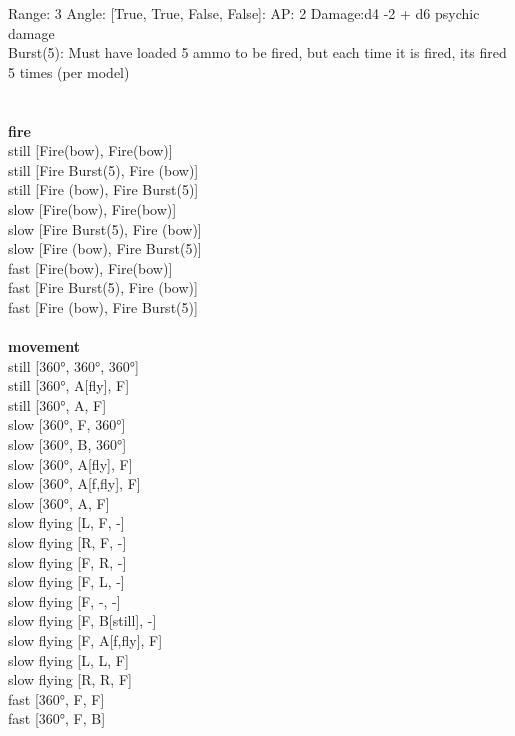 Range: 3  Angle: [True, True, False, False]: AP: 2 Damage:d4 -2 + d6 psychic damage \\
Burst(5): Must have loaded 5 ammo to be fired, but each time it is fired, its fired 5 times (per model)\\ 




 
\ \\



\ \\ {\bf fire } \\
still [Fire(bow), Fire(bow)] \\
still [Fire Burst(5), Fire (bow)] \\
still [Fire (bow), Fire Burst(5)] \\
slow [Fire(bow), Fire(bow)] \\
slow [Fire Burst(5), Fire (bow)] \\
slow [Fire (bow), Fire Burst(5)] \\
fast [Fire(bow), Fire(bow)] \\
fast [Fire Burst(5), Fire (bow)] \\
fast [Fire (bow), Fire Burst(5)] \\
\ \\ {\bf movement } \\
still [360°, 360°, 360°] \\
still [360°, A[fly], F] \\
still [360°, A, F] \\
slow [360°, F, 360°] \\
slow [360°, B, 360°] \\
slow [360°, A[fly], F] \\
slow [360°, A[f,fly], F] \\
slow [360°, A, F] \\
slow flying [L, F, -] \\
slow flying [R, F, -] \\
slow flying [F, R, -] \\
slow flying [F, L, -] \\
slow flying [F, -, -] \\
slow flying [F, B[still], -] \\
slow flying [F, A[f,fly], F] \\
slow flying [L, L, F] \\
slow flying [R, R, F] \\
fast [360°, F, F] \\
fast [360°, F, B] \\
